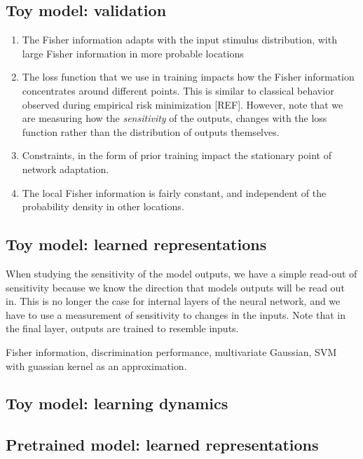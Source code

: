 \documentclass[10pt]{article}      %
\begin{document}
\subsection{Toy model: validation}


\begin{enumerate}
  \item The Fisher information adapts with the input stimulus distribution, with large Fisher information in more probable locations
  \item The loss function that we use in training impacts how the Fisher information concentrates around different points. This is similar to classical behavior observed during empirical risk minimization [REF]. However, note that we are measuring how the \textit{sensitivity} of the outputs, changes with the loss function rather than the distribution of outputs themselves. 
  \item Constraints, in the form of prior training impact the stationary point of network adaptation.
  \item The local Fisher information is fairly constant, and independent of the probability density in other locations.
\end{enumerate}




\subsection{Toy model: learned representations}

When studying the sensitivity of the model outputs, we have a simple read-out of sensitivity because we know the direction that models outputs will be read out in.
This is no longer the case for internal layers of the neural network, and we have to use a measurement of sensitivity to changes in the inputs.
Note that in the final layer, outputs are trained to resemble inputs.

Fisher information, discrimination performance, multivariate Gaussian, SVM with guassian kernel as an approximation.




\subsection{Toy model: learning dynamics}






\subsection{Pretrained model: learned representations}
\end{document}
